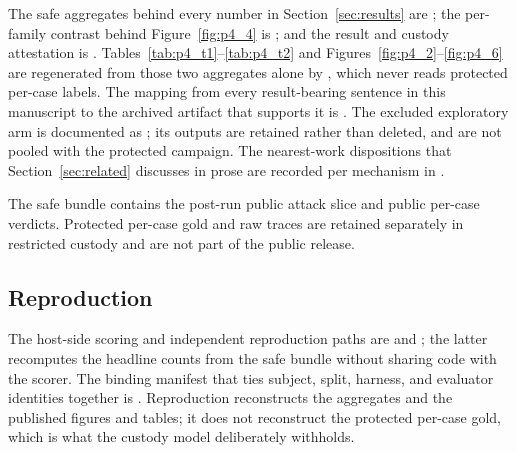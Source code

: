 The safe aggregates behind every number in Section~\ref{sec:results} are ; the per-family contrast behind Figure~\ref{fig:p4_4} is ; and the result and custody attestation is . Tables~\ref{tab:p4_t1}--\ref{tab:p4_t2} and Figures~\ref{fig:p4_2}--\ref{fig:p4_6} are regenerated from those two aggregates alone by , which never reads protected per-case labels. The mapping from every result-bearing sentence in this manuscript to the archived artifact that supports it is . The excluded exploratory arm is documented as ; its outputs are retained rather than deleted, and are not pooled with the protected campaign. The nearest-work dispositions that Section~\ref{sec:related} discusses in prose are recorded per mechanism in .

The safe bundle contains the post-run public attack slice and public per-case verdicts. Protected per-case gold and raw traces are retained separately in restricted custody and are not part of the public release.

\subsection{Reproduction}
The host-side scoring and independent reproduction paths are  and ; the latter recomputes the headline counts from the safe bundle without sharing code with the scorer. The binding manifest that ties subject, split, harness, and evaluator identities together is . Reproduction reconstructs the aggregates and the published figures and tables; it does not reconstruct the protected per-case gold, which is what the custody model deliberately withholds.

